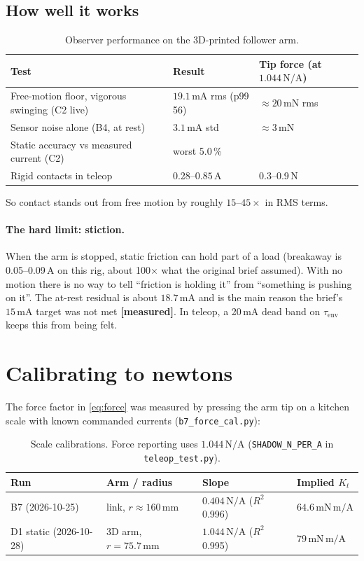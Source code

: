 \documentclass[11pt,a4paper]{article}
\newcommand{\mA}{\,\mathrm{mA}}
\newcommand{\A}{\,\mathrm{A}}
\newcommand{\mN}{\,\mathrm{mN}}
\newcommand{\NpA}{\,\mathrm{N/A}}
\newcommand{\file}[1]{\texttt{#1}}
\newcommand{\measured}{\textcolor{teal!70!black}{\textbf{[measured]}}}
\begin{document}
\subsection{How well it works}

\begin{table}[h]
\centering
\begin{tabular}{@{}lll@{}}
\toprule
Test & Result & Tip force (at $1.044\NpA$) \\
\midrule
Free-motion floor, vigorous swinging (C2 live) & $19.1\mA$ rms (p99 56) & $\approx 20\mN$ rms \\
Sensor noise alone (B4, at rest) & $3.1\mA$ std & $\approx 3\mN$ \\
Static accuracy vs measured current (C2) & worst 5.0\,\% & \\
Rigid contacts in teleop & 0.28--$0.85\A$ & 0.3--0.9\,N \\
\bottomrule
\end{tabular}
\caption{Observer performance on the 3D-printed follower arm.}
\end{table}

So contact stands out from free motion by roughly $15$--$45\times$ in RMS
terms.

\paragraph{The hard limit: stiction.} When the arm is stopped, static
friction can hold part of a load (breakaway is 0.05--0.09\,A on this rig,
about 100$\times$ what the original brief assumed). With no motion there
is no way to tell ``friction is holding it'' from ``something is pushing
on it''. The at-rest residual is about $18.7\mA$ and is the main reason
the brief's $15\mA$ target was not met \measured. In teleop, a 20\,mA dead
band on $\tau_{\mathrm{env}}$ keeps this from being felt.

\section{Calibrating to newtons}

The force factor in \eqref{eq:force} was measured by pressing the arm tip
on a kitchen scale with known commanded currents
(\file{b7\_force\_cal.py}):

\begin{table}[h]
\centering
\begin{tabular}{@{}llll@{}}
\toprule
Run & Arm / radius & Slope & Implied $K_t$ \\
\midrule
B7 (2026-10-25) & link, $r\approx160\,\mathrm{mm}$ & $0.404\NpA$ ($R^2$ 0.996) & $64.6\,\mathrm{mN\,m/A}$ \\
D1 static (2026-10-28) & 3D arm, $r = 75.7\,\mathrm{mm}$ & $1.044\NpA$ ($R^2$ 0.995) & $79\,\mathrm{mN\,m/A}$ \\
\bottomrule
\end{tabular}
\caption{Scale calibrations. Force reporting uses $1.044\NpA$
(\file{SHADOW\_N\_PER\_A} in \file{teleop\_test.py}).}
\end{table}
\end{document}
